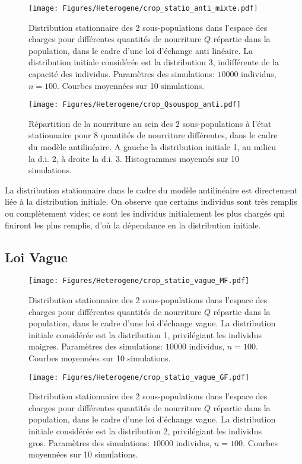 \begin{figure}[h!]
\centering
\texttt{[image: Figures/Heterogene/crop\_statio\_anti\_mixte.pdf]}
\caption{Distribution stationnaire des 2 sous-populations dans l'espace des charges pour différentes quantités de nourriture $Q$ répartie dans la population, dans le cadre d'une loi d'échange anti linéaire. La distribution initiale considérée est la distribution 3, indifférente de la capacité des individus. Paramètres des simulations: $10000$ individus, $n=100$. Courbes moyennées sur 10 simulations.}
\label{statio_anti_mixte}
\end{figure}


\begin{figure}[h!]
\centering
\texttt{[image: Figures/Heterogene/crop\_Qsouspop\_anti.pdf]}
\caption{Répartition de la nourriture au sein des 2 sous-populations à l'état stationnaire pour 8 quantités de nourriture différentes, dans le cadre du modèle antilinéaire. A gauche la distribution initiale 1, au milieu la d.i. 2, à droite la d.i. 3. Histogrammes moyennés sur 10 simulations.}
\label{Qsouspop_anti}
\end{figure}

La distribution stationnaire dans le cadre du modèle antilinéaire est directement liée à la distribution initiale. On observe que certains individus sont très remplis ou complètement vides; ce sont les individus initialement les plus chargés qui finiront les plus remplis, d'où la dépendance en la distribution initiale.


\clearpage

\subsection{Loi Vague}

\begin{figure}[h!]
\centering
\texttt{[image: Figures/Heterogene/crop\_statio\_vague\_MF.pdf]}
\caption{Distribution stationnaire des 2 sous-populations dans l'espace des charges pour différentes quantités de nourriture $Q$ répartie dans la population, dans le cadre d'une loi d'échange vague. La distribution initiale considérée est la distribution 1, privilégiant les individus maigres. Paramètres des simulations: $10000$ individus, $n=100$. Courbes moyennées sur 10 simulations.}
\label{statio_vague_MF}
\end{figure}

\begin{figure}[h!]
\centering
\texttt{[image: Figures/Heterogene/crop\_statio\_vague\_GF.pdf]}
\caption{Distribution stationnaire des 2 sous-populations dans l'espace des charges pour différentes quantités de nourriture $Q$ répartie dans la population, dans le cadre d'une loi d'échange vague. La distribution initiale considérée est la distribution 2, privilégiant les individus gros. Paramètres des simulations: $10000$ individus, $n=100$. Courbes moyennées sur 10 simulations.}
\label{statio_vague_GF}
\end{figure}

